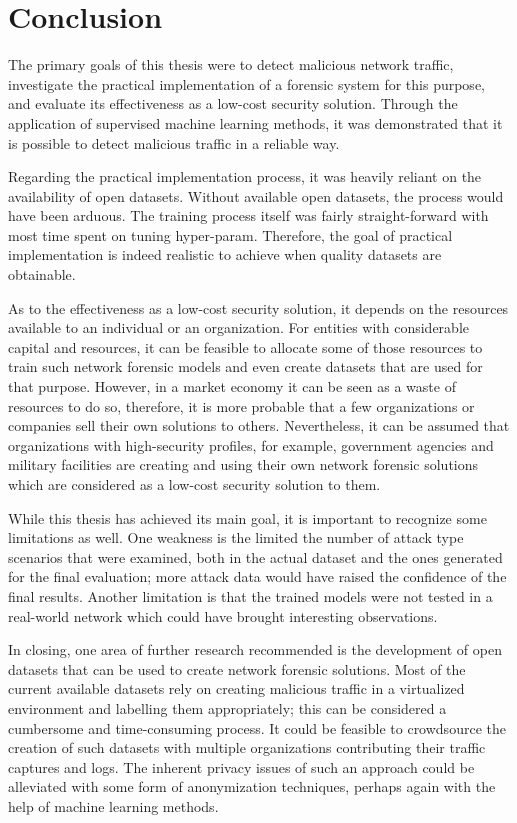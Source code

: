 \clearpage%
\vspace{21.5pt}


\chapter{Conclusion}\label{ch:conclusions}

The primary goals of this thesis were to detect malicious network traffic,
investigate the practical implementation of a forensic system for this purpose,
and evaluate its effectiveness as a low-cost security solution.
Through the application of supervised machine learning methods,
it was demonstrated that it is possible to detect malicious traffic in a reliable way.

Regarding the practical implementation process, it was heavily reliant on the availability of open datasets.
Without available open datasets, the process would have been arduous.
The training process itself was fairly straight-forward with most time spent on tuning \gls{hyper-param}.
Therefore, the goal of practical implementation is indeed realistic to achieve when quality datasets are obtainable.

As to the effectiveness as a low-cost security solution,
it depends on the resources available to an individual or an organization.
For entities with considerable capital and resources,
it can be feasible to allocate some of those resources to train such network forensic models
and even create datasets that are used for that purpose.
However, in a market economy it can be seen as a waste of resources to do so,
therefore, it is more probable that a few organizations or companies sell their own solutions to others.
Nevertheless, it can be assumed that organizations with high-security profiles, for example,
government agencies and military facilities are creating
and using their own network forensic solutions which are considered as a low-cost security solution to them.

While this thesis has achieved its main goal, it is important to recognize some limitations as well.
One weakness is the limited the number of attack type scenarios that were examined,
both in the actual dataset and the ones generated for the final evaluation;
more attack data would have raised the confidence of the final results.
Another limitation is
that the trained models were not tested in a real-world network which could have brought interesting observations.

In closing,
one area of further research recommended is the development of open datasets
that can be used to create network forensic solutions.
Most of the current available datasets rely
on creating malicious traffic in a virtualized environment and labelling them appropriately;
this can be considered a cumbersome and time-consuming process.
It could be feasible to crowdsource the creation of such datasets with multiple organizations
contributing their traffic captures and logs.
The inherent privacy issues of such an approach could be alleviated with some form of anonymization techniques,
perhaps again with the help of machine learning methods.
